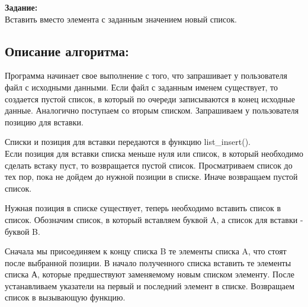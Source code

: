 \documentclass[a4paper,14pt]{extreport}
\begin{document}

\textbf{Задание:}\\
		Вставить вместо элемента с заданным значением новый список.
\subsection*{Описание алгоритма:}
Программа начинает свое выполнение с того, что запрашивает у пользователя файл с исходными данными.
Если файл с заданным именем существует, то создается пустой список, в который по очереди записываются в конец исходные данные.
Аналогично поступаем со вторым списком. Запрашиваем у пользователя позицию для вставки.

Списки и позиция для вставки передаются в функцию list\_insert().\\ 

Если позиция для вставки списка меньше нуля или список, в который необходимо сделать встаку пуст, то возвращается пустой список. 
Просматриваем список до тех пор, пока не дойдем до нужной позиции в списке. Иначе возвращаем пустой список. 

Нужная позиция в списке существует, теперь необходимо вставить список в список. 
Обозначим список, в который вставляем буквой A, а список для вставки - буквой B.

Сначала мы присоединяем к концу списка B те элементы списка A, что стоят после выбранной позиции. 
В начало полученного списка вставить те элементы списка А, которые предшествуют заменяемому новым списком элементу.
После устанавливаем указатели на первый и последний элемент в списке. Возвращаем список в вызывающую функцию. 
\end{document}
